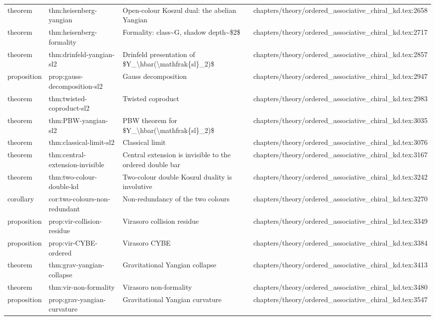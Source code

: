 \documentclass[11pt]{article}
\begin{document}
\begin{longtable}{L{0.10\textwidth}L{0.26\textwidth}L{0.42\textwidth}L{0.22\textwidth}}
theorem & thm:heisenberg-yangian & Op{}en-colour Koszul dual: the abelian Yangian & chapters/theory/ordered\_associative\_chiral\_kd.tex:2658\\
theorem & thm:heisenberg-formality & Formality: class\textasciitilde{}G, shadow depth\textasciitilde{}\$2\$ & chapters/theory/ordered\_associative\_chiral\_kd.tex:2717\\
theorem & thm:drinfeld-yangian-sl2 & Drinfeld presentation of \$Y\_\textbackslash{}hbar(\textbackslash{}mathfrak\{sl\}\_2)\$ & chapters/theory/ordered\_associative\_chiral\_kd.tex:2857\\
proposition & prop:gauss-decomposition-sl2 & Gauss decomposition & chapters/theory/ordered\_associative\_chiral\_kd.tex:2947\\
theorem & thm:twisted-coproduct-sl2 & Twisted coproduct & chapters/theory/ordered\_associative\_chiral\_kd.tex:2983\\
theorem & thm:PBW-yangian-sl2 & PBW theorem for \$Y\_\textbackslash{}hbar(\textbackslash{}mathfrak\{sl\}\_2)\$ & chapters/theory/ordered\_associative\_chiral\_kd.tex:3035\\
theorem & thm:classical-limit-sl2 & Classical limit & chapters/theory/ordered\_associative\_chiral\_kd.tex:3076\\
theorem & thm:central-extension-invisible & Central extension is invisible to the ordered double bar & chapters/theory/ordered\_associative\_chiral\_kd.tex:3167\\
theorem & thm:two-colour-double-kd & Two-colour double Koszul duality is involutive & chapters/theory/ordered\_associative\_chiral\_kd.tex:3242\\
corollary & cor:two-colours-non-redundant & Non-redundancy of the two colours & chapters/theory/ordered\_associative\_chiral\_kd.tex:3270\\
proposition & prop:vir-collision-residue & Virasoro collision residue & chapters/theory/ordered\_associative\_chiral\_kd.tex:3349\\
proposition & prop:vir-CYBE-ordered & Virasoro CYBE & chapters/theory/ordered\_associative\_chiral\_kd.tex:3384\\
theorem & thm:grav-yangian-collapse & Gravitational Yangian collapse & chapters/theory/ordered\_associative\_chiral\_kd.tex:3413\\
theorem & thm:vir-non-formality & Virasoro non-formality & chapters/theory/ordered\_associative\_chiral\_kd.tex:3480\\
proposition & prop:grav-yangian-curvature & Gravitational Yangian curvature & chapters/theory/ordered\_associative\_chiral\_kd.tex:3547\\

\end{longtable}
\end{document}
